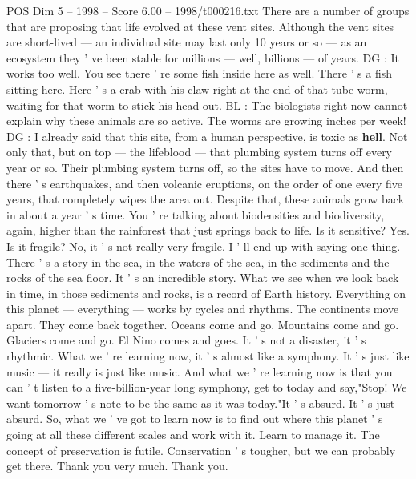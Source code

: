 \begin{textsample}{POS Dim 5 – 1998 – Score 6.00 – 1998/t000216.txt}
There are a number of groups that are proposing that life evolved at these vent sites.
Although the vent sites are short-lived — an individual site may last only 10 years or so — as an ecosystem they ' ve been stable for millions — well, billions — of years.
DG : It works too well.
You see there ' re some fish inside here as well.
There ' s a fish sitting here.
Here ' s a crab with his claw right at the end of that tube worm, waiting for that worm to stick his head out.
BL : The biologists right now cannot explain why these animals are so active.
The worms are growing inches per week!
DG : I already said that this site, from a human perspective, is toxic as \textbf{hell}.
Not only that, but on top — the lifeblood — that plumbing system turns off every year or so.
Their plumbing system turns off, so the sites have to move.
And then there ' s earthquakes, and then volcanic eruptions, on the order of one every five years, that completely wipes the area out.
Despite that, these animals grow back in about a year ' s time.
You ' re talking about biodensities and biodiversity, again, higher than the rainforest that just springs back to life.
Is it sensitive?
Yes.
Is it fragile?
No, it ' s not really very fragile.
I ' ll end up with saying one thing.
There ' s a story in the sea, in the waters of the sea, in the sediments and the rocks of the sea floor.
It ' s an incredible story.
What we see when we look back in time, in those sediments and rocks, is a record of Earth history.
Everything on this planet — everything — works by cycles and rhythms.
The continents move apart.
They come back together.
Oceans come and go.
Mountains come and go.
Glaciers come and go.
El Nino comes and goes.
It ' s not a disaster, it ' s rhythmic.
What we ' re learning now, it ' s almost like a symphony.
It ' s just like music — it really is just like music.
And what we ' re learning now is that you can ' t listen to a five-billion-year long symphony, get to today and say,"Stop!
We want tomorrow ' s note to be the same as it was today."It ' s absurd.
It ' s just absurd.
So, what we ' ve got to learn now is to find out where this planet ' s going at all these different scales and work with it.
Learn to manage it.
The concept of preservation is futile.
Conservation ' s tougher, but we can probably get there.
Thank you very much.
Thank you.

\end{textsample}
